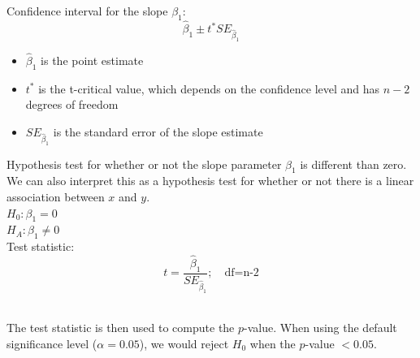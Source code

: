 \documentclass[11pt]{beamer}\usepackage[]{graphicx}\usepackage[]{color}
\begin{document}
\begin{frame}
Confidence interval for the slope $\beta_1$:
$$\hat{\beta}_1 \pm t^* SE_{\hat{\beta}_1}$$

\begin{itemize}
\item $\hat{\beta}_1$ is the point estimate 
\item $t^*$ is the t-critical value, which depends on the confidence level and has $n-2$ degrees of freedom
\item $SE_{\hat{\beta}_1}$ is the standard error of the slope estimate 
\end{itemize}
\end{frame}

\begin{frame}
Hypothesis test for whether or not the slope parameter $\beta_1$ is different than zero.  We can also interpret this as a hypothesis test for whether or not there is a linear association between $x$ and $y$.\\
\vspace{10pt}
$H_0: \beta_1 = 0$\\
\vspace{5pt}
$H_A: \beta_1 \neq 0$\\
\vspace{10pt}
Test statistic:\\
$$t = \frac{\hat{\beta}_1}{SE_{\hat{\beta}_1}}; \quad \text{df=n-2}$$\\
\vspace{10pt}

The test statistic is then used to compute the $p$-value.  When using the default significance level ($\alpha = 0.05$), we would reject $H_0$ when the $p$-value $<0.05$.
\end{frame}
\end{document}
